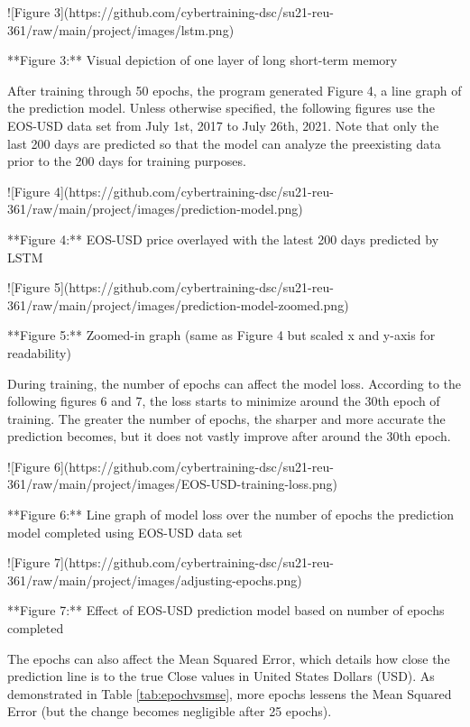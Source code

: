 \documentclass[acmtog,authorversion]{acmart}
\begin{document}
![Figure 3](https://github.com/cybertraining-dsc/su21-reu-361/raw/main/project/images/lstm.png)

**Figure 3:** Visual depiction of one layer of long short-term memory \cite{c-9}

After training through 50 epochs, the program generated Figure 4, a line graph of the prediction model. Unless otherwise specified, the following figures use the EOS-USD data set from July 1st, 2017 to July 26th, 2021. Note that only the last 200 days are predicted so that the model can analyze the preexisting data prior to the 200 days for training purposes.

![Figure 4](https://github.com/cybertraining-dsc/su21-reu-361/raw/main/project/images/prediction-model.png)

**Figure 4:** EOS-USD price overlayed with the latest 200 days predicted by LSTM

![Figure 5](https://github.com/cybertraining-dsc/su21-reu-361/raw/main/project/images/prediction-model-zoomed.png)

**Figure 5:** Zoomed-in graph (same as Figure 4 but scaled x and y-axis for readability)

During training, the number of epochs can affect the model loss. According to the following figures 6 and 7, the loss starts to minimize around the 30th epoch of training. The greater the number of epochs, the sharper and more accurate the prediction becomes, but it does not vastly improve after around the 30th epoch.

![Figure 6](https://github.com/cybertraining-dsc/su21-reu-361/raw/main/project/images/EOS-USD-training-loss.png)

**Figure 6:** Line graph of model loss over the number of epochs the prediction model completed using EOS-USD data set

![Figure 7](https://github.com/cybertraining-dsc/su21-reu-361/raw/main/project/images/adjusting-epochs.png)

**Figure 7:** Effect of EOS-USD prediction model based on number of epochs completed

The epochs can also affect the Mean Squared Error, which details how close the prediction line is to the true Close values in United States Dollars (USD). As demonstrated in Table \ref{tab:epochvsmse}, more epochs lessens the Mean Squared Error (but the change becomes negligible after 25 epochs).
\end{document}
